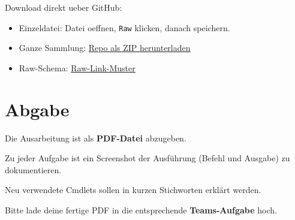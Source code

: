 \documentclass[11pt, oneside, numbers=noenddot]{scrbook}
\begin{document}
Download direkt ueber GitHub:
\begin{itemize}
\item Einzeldatei: Datei oeffnen, \texttt{Raw} klicken, danach speichern.
\item Ganze Sammlung: \href{https://github.com/michelroegl-brunner/HTL-Braunau/archive/refs/heads/main.zip}{Repo als ZIP herunterladen}
\item Raw-Schema: \href{https://raw.githubusercontent.com/michelroegl-brunner/HTL-Braunau/main/BEISPIELDATEIN/<AUFGABE>/<DATEI>}{Raw-Link-Muster}
\end{itemize}

\chapter{Abgabe}
Die Ausarbeitung ist als \textbf{PDF-Datei} abzugeben.

Zu jeder Aufgabe ist ein Screenshot der Ausführung (Befehl und Ausgabe) zu dokumentieren.

Neu verwendete Cmdlets sollen in kurzen Stichworten erklärt werden.

Bitte lade deine fertige PDF in die entsprechende \textbf{Teams-Aufgabe} hoch.
\end{document}
